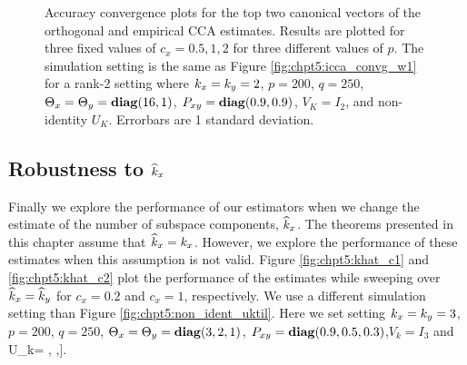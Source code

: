 \begin{figure}
\begin{center}
{    }
    \caption{Accuracy convergence plots for the top two canonical vectors of the
      orthogonal and empirical CCA estimates. Results are plotted for three fixed values
      of $c_x=0.5,1,2$ for three different values of $p$. The simulation setting is the
      same as Figure \ref{fig:chpt5:icca_convg_w1} for a rank-2 setting where $k_x=k_y=2$,
      $p=200$, $q=250$, $\Theta_x=\Theta_y=\mathop{\bf diag}(16,1)$, $P_{xy}=\mathop{\bf diag}(0.9,0.9)$, $V_K=I_2$, and
      non-identity $U_K$. Errorbars are 1 standard deviation.}
    \label{fig:chpt5:icca_vect_convg2}
  \end{center}
\end{figure}


\subsection{Robustness to $\widehat{k}_x$}

Finally we explore the performance of our estimators when we change the estimate of the
number of subspace components, $\widehat{k}_x$. The theorems presented in this chapter assume
that $\widehat{k}_x=k_x$. However, we explore the performance of these estimates when this
assumption is not valid. Figure \ref{fig:chpt5:khat_c1} and \ref{fig:chpt5:khat_c2} plot
the performance of the estimates while sweeping over $\widehat{k}_x=\widehat{k}_y$ for $c_x=0.2$ and
$c_x=1$, respectively. We use a different simulation setting than Figure
\ref{fig:chpt5:non_ident_uktil}. Here we set setting $k_x=k_y=3$, $p=200$, $q=250$,
$\Theta_x=\Theta_y=\mathop{\bf diag}(3,2,1)$, $P_{xy}=\mathop{\bf diag}(0.9,0.5,0.3)$,$V_k=I_3$ and 
\be
U_k= \left[\frac{1}{\sqrt{3}}\left[\begin{array}{c} 1\\ 1\\1\end{array}\right],
    \left[\begin{array}{c} 1\\
        0\\-1\end{array}\right],\left[\begin{array}{c} 1\\
        -2\\1\end{array}\right]\right]. 
\ee

